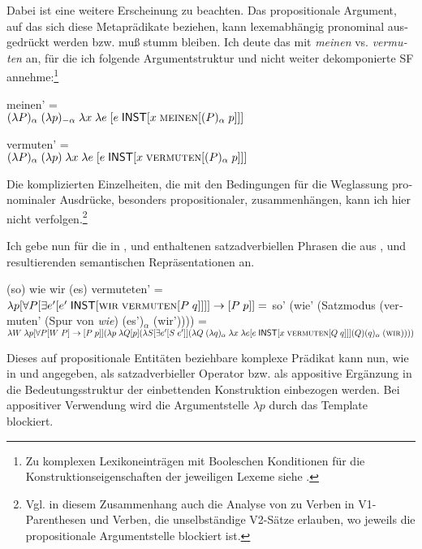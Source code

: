 \documentclass[output=paper, colorlinks, citecolor=brown, booklanguage=german]{langscibook}
\begin{document}
\begin{otherlanguage}{german}
Dabei ist eine weitere Erscheinung zu beachten. Das propositionale Argument, auf das sich diese Metaprädikate beziehen, kann lexemabhängig pronominal ausgedrückt werden bzw. muß stumm bleiben. Ich deute das mit \textit{meinen} vs. \textit{vermuten} an, für die ich folgende Argumentstruktur und nicht weiter dekomponierte SF annehme:\footnote{Zu komplexen Lexikoneinträgen mit Booleschen Konditionen für die Konstruktionseigenschaften der jeweiligen Lexeme siehe \citet{bierwisch1996lexicalinformationminimalist}.}

\ea \label{ex:zi97:48} meinen' = \\
$(\lambda P)_\alpha \; (\lambda p)_{-\alpha} \; \lambda x \; \lambda e \; [e \; \cnst{inst} [x \; \textsc{meinen} [(P)_\alpha \; p]]]$

\ex \label{ex:zi97:49} vermuten' = \\
$(\lambda P)_\alpha \; (\lambda p) \; \lambda x \; \lambda e \; [e \; \cnst{inst} [x \; \textsc{vermuten} [(P)_\alpha \; p]]]$
\z

\noindent Die komplizierten Einzelheiten, die mit den Bedingungen für die Weglassung pronominaler Ausdrücke, besonders propositionaler, zusammenhängen, kann ich hier nicht verfolgen.\footnote{Vgl. in diesem Zusammenhang auch die Analyse von \citet{reis95, reis96a, reis96b} zu
Verben in V1-Parenthesen und Verben, die unselbständige V2-Sätze erlauben, wo jeweils die propositionale Argumentstelle blockiert ist.}

Ich gebe nun für die in ,  und  enthaltenen satzadverbiellen Phrasen die aus ,  und  resultierenden semantischen Repräsentationen an.

\ea \label{ex:zi97:50} (so) wie wir (es) vermuteten' = \\
$\lambda p [\forall P [\exists e' [e' \; \cnst{inst} [\textsc{wir} \; \textsc{vermuten} [P \; q]]]] \rightarrow [P \; p]] =$ \newline
so' \; (wie' (Satzmodus (vermuten' (Spur von \textit{wie}) (es')$_{\alpha}$ (wir')))) = \newline
$\lambda W \; \lambda p [\forall P [W \; P] \rightarrow [P \; p]] (\lambda p \; \lambda Q [p] (\lambda S [\exists e' [S \; e']] \newline (\lambda Q \; (\lambda q)_{\alpha} \; \lambda x \; \lambda e [e \; \cnst{inst} [x \; \textsc{vermuten} [Q \; q]]] (Q)(q)_{\alpha} \; (\textsc{wir}))))$
\z

\noindent Dieses auf propositionale Entitäten beziehbare komplexe Prädikat kann nun, wie in  und  angegeben, als satzadverbieller Operator bzw. als appositive Ergänzung in die Bedeutungsstruktur der einbettenden Konstruktion einbezogen werden. Bei appositiver Verwendung wird die Argumentstelle $\lambda p$ durch das Template  blockiert.


\end{otherlanguage}
\end{document}
